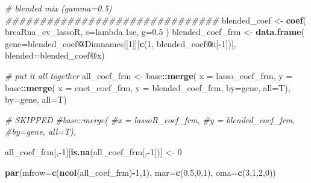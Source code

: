 \documentclass[
]{book}
\newenvironment{Shaded}{\begin{snugshade}}{\end{snugshade}}
\newcommand{\CommentTok}[1]{\textcolor[rgb]{0.56,0.35,0.01}{\textit{#1}}}
\newcommand{\DataTypeTok}[1]{\textcolor[rgb]{0.13,0.29,0.53}{#1}}
\newcommand{\DecValTok}[1]{\textcolor[rgb]{0.00,0.00,0.81}{#1}}
\newcommand{\FloatTok}[1]{\textcolor[rgb]{0.00,0.00,0.81}{#1}}
\newcommand{\KeywordTok}[1]{\textcolor[rgb]{0.13,0.29,0.53}{\textbf{#1}}}
\newcommand{\NormalTok}[1]{#1}
\newcommand{\OperatorTok}[1]{\textcolor[rgb]{0.81,0.36,0.00}{\textbf{#1}}}
\newcommand{\StringTok}[1]{\textcolor[rgb]{0.31,0.60,0.02}{#1}}
\begin{document}
\begin{Shaded}
\begin{Highlighting}[]
\CommentTok{\# blended mix (gamma=0.5)}
\CommentTok{\#\#\#\#\#\#\#\#\#\#\#\#\#\#\#\#\#\#\#\#\#\#\#\#\#\#\#\#\#\#\#}
\NormalTok{blended\_coef <{-}}\StringTok{ }\KeywordTok{coef}\NormalTok{(}
\NormalTok{ brcaRna\_cv\_lassoR,}
 \DataTypeTok{s=}\StringTok{\textquotesingle{}lambda.1se\textquotesingle{}}\NormalTok{,}
 \DataTypeTok{g=}\FloatTok{0.5}
\NormalTok{)}
\NormalTok{blended\_coef\_frm <{-}}\StringTok{ }\KeywordTok{data.frame}\NormalTok{(}
 \DataTypeTok{gene=}\NormalTok{blended\_coef}\OperatorTok{@}\NormalTok{Dimnames[[}\DecValTok{1}\NormalTok{]][}\KeywordTok{c}\NormalTok{(}\DecValTok{1}\NormalTok{, blended\_coef}\OperatorTok{@}\NormalTok{i[}\OperatorTok{{-}}\DecValTok{1}\NormalTok{])],}
 \DataTypeTok{blended=}\NormalTok{blended\_coef}\OperatorTok{@}\NormalTok{x)}


\CommentTok{\# put it all together}
\NormalTok{all\_coef\_frm <{-}}\StringTok{ }
\StringTok{ }\NormalTok{base}\OperatorTok{::}\KeywordTok{merge}\NormalTok{(}
 \DataTypeTok{x =}\NormalTok{ lasso\_coef\_frm, }
 \DataTypeTok{y =}\NormalTok{ base}\OperatorTok{::}\KeywordTok{merge}\NormalTok{(}
     \DataTypeTok{x =}\NormalTok{ enet\_coef\_frm,}
     \DataTypeTok{y =}\NormalTok{ blended\_coef\_frm,}
         \DataTypeTok{by=}\StringTok{\textquotesingle{}gene\textquotesingle{}}\NormalTok{, }\DataTypeTok{all=}\NormalTok{T),}
 \DataTypeTok{by=}\StringTok{\textquotesingle{}gene\textquotesingle{}}\NormalTok{, }\DataTypeTok{all=}\NormalTok{T)}

\CommentTok{\# SKIPPED}
\CommentTok{\#base::merge(}
         \CommentTok{\#x = lassoR\_coef\_frm,}
         \CommentTok{\#y = blended\_coef\_frm,}
         \CommentTok{\#by=\textquotesingle{}gene\textquotesingle{}, all=T),}

\NormalTok{all\_coef\_frm[,}\OperatorTok{{-}}\DecValTok{1}\NormalTok{][}\KeywordTok{is.na}\NormalTok{(all\_coef\_frm[,}\OperatorTok{{-}}\DecValTok{1}\NormalTok{])] <{-}}\StringTok{ }\DecValTok{0}

\KeywordTok{par}\NormalTok{(}\DataTypeTok{mfrow=}\KeywordTok{c}\NormalTok{(}\KeywordTok{ncol}\NormalTok{(all\_coef\_frm)}\OperatorTok{{-}}\DecValTok{1}\NormalTok{,}\DecValTok{1}\NormalTok{), }\DataTypeTok{mar=}\KeywordTok{c}\NormalTok{(}\DecValTok{0}\NormalTok{,}\DecValTok{5}\NormalTok{,}\DecValTok{0}\NormalTok{,}\DecValTok{1}\NormalTok{), }\DataTypeTok{oma=}\KeywordTok{c}\NormalTok{(}\DecValTok{3}\NormalTok{,}\DecValTok{1}\NormalTok{,}\DecValTok{2}\NormalTok{,}\DecValTok{0}\NormalTok{))}


\end{Highlighting}
\end{Shaded}
\end{document}
